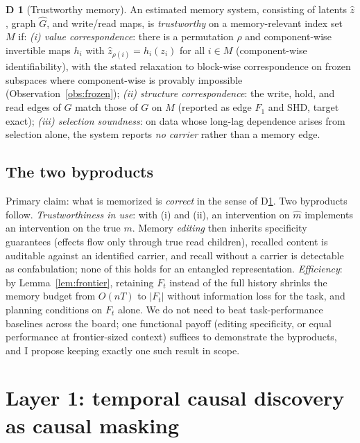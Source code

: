\documentclass[11pt]{article}
\theoremstyle{plain}
\theoremstyle{definition}
\newtheorem{definitionx}{D}
\begin{document}
\begin{definitionx}[Trustworthy memory]\label{def:trust}
An estimated memory system, consisting of latents $\hat z$, graph $\hat G$, and write/read maps, is \emph{trustworthy} on a memory-relevant index set $M$ if:
\emph{(i) value correspondence}: there is a permutation $\rho$ and component-wise invertible maps $h_i$ with $\hat z_{\rho(i)} = h_i(z_i)$ for all $i \in M$ (component-wise identifiability), with the stated relaxation to block-wise correspondence on frozen subspaces where component-wise is provably impossible (Observation~\ref{obs:frozen});
\emph{(ii) structure correspondence}: the write, hold, and read edges of $\hat G$ match those of $G$ on $M$ (reported as edge $F_1$ and SHD, target exact);
\emph{(iii) selection soundness}: on data whose long-lag dependence arises from selection alone, the system reports \emph{no carrier} rather than a memory edge.
\end{definitionx}

\subsection{The two byproducts}\label{sec:byproducts}
Primary claim: what is memorized is \emph{correct} in the sense of D\ref{def:trust}. Two byproducts follow. \emph{Trustworthiness in use}: with (i) and (ii), an intervention on $\hat m$ implements an intervention on the true $m$. Memory \emph{editing} then inherits specificity guarantees (effects flow only through true read children), recalled content is auditable against an identified carrier, and recall without a carrier is detectable as confabulation; none of this holds for an entangled representation. \emph{Efficiency}: by Lemma~\ref{lem:frontier}, retaining $F_t$ instead of the full history shrinks the memory budget from $O(nT)$ to $|F_t|$ without information loss for the task, and planning conditions on $F_t$ alone. We do not need to beat task-performance baselines across the board; one functional payoff (editing specificity, or equal performance at frontier-sized context) suffices to demonstrate the byproducts, and I propose keeping exactly one such result in scope.

\section{Layer 1: temporal causal discovery as causal masking}\label{sec:layer1}
\end{document}
